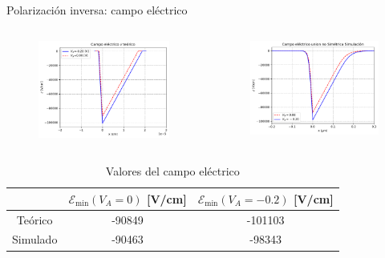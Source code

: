 \documentclass[aspectratio=169,xcolor=dvipsnames]{beamer}
\begin{document}
\begin{frame}{Polarización inversa: campo eléctrico}
    \begin{columns}
    \begin{column}{0.5\textwidth}
        \begin{figure}
            \includegraphics[width=0.90\linewidth]{Teorico/Campo_Electrico-Inversa.pdf}
        \end{figure}
    \end{column}
    \begin{column}{0.5\textwidth}
        \begin{figure}
            \includegraphics[width=0.90\linewidth]{Inversa/Campo_Electrico-Inversa.pdf}
        \end{figure}
    \end{column}
    \end{columns}
    \begin{table}
        \caption{Valores del campo eléctrico}
        \begin{tabular}{c|cc}
            & $\mathcal{E}_{\min} (V_A=0)$ [V/cm] & $\mathcal{E}_{\min} (V_A=-0.2)$ [V/cm]  \\ \hline
            Teórico & -90849 & -101103 \\
            Simulado & -90463 & -98343 
        \end{tabular}
    \end{table}
\end{frame}
\end{document}
